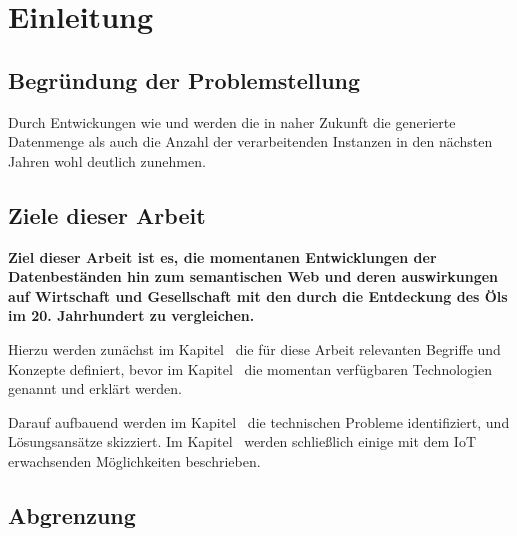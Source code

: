 \section{Einleitung}
\label{sec:einleitung}

\subsection{Begründung der Problemstellung}

Durch Entwickungen wie  und  werden die in naher Zukunft die generierte Datenmenge als auch die Anzahl der verarbeitenden Instanzen in den nächsten Jahren wohl deutlich zunehmen.

\subsection{Ziele dieser Arbeit}

\textbf{Ziel dieser Arbeit ist es, die momentanen Entwicklungen der Datenbeständen hin zum semantischen Web und deren auswirkungen auf Wirtschaft und Gesellschaft mit den durch die Entdeckung des Öls im 20. Jahrhundert zu vergleichen.}

Hierzu werden zunächst im Kapitel~ die für diese Arbeit relevanten Begriffe und Konzepte definiert, bevor im Kapitel~ die momentan verfügbaren Technologien genannt und erklärt werden. 

Darauf aufbauend werden im Kapitel~ die technischen Probleme identifiziert, und Lösungsansätze skizziert. Im Kapitel~ werden schließlich einige mit dem IoT erwachsenden Möglichkeiten beschrieben. 


\subsection{Abgrenzung}

